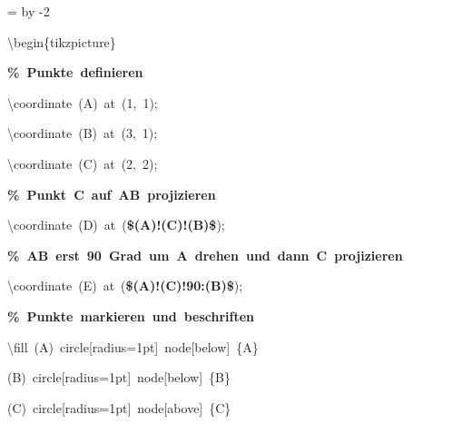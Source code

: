 \begingroup
\ttfamily
{}
=\textwidth
\advance{} by -2\fboxsep
\noindent
\colorbox{background}
{%
\parbox{\dimen255}
{%
\rule[-0.5ex]{0pt}{2.5ex}\hspace*{0.0em}\textbackslash{}begin\{tikzpicture\}\\
\rule[-0.5ex]{0pt}{2.5ex}\hspace*{1.0em}\textcolor{G}{\textbf{\%~Punkte~definieren}}\\
\rule[-0.5ex]{0pt}{2.5ex}\hspace*{1.0em}\textbackslash{}coordinate~(A)~at~(1,~1);\\
\rule[-0.5ex]{0pt}{2.5ex}\hspace*{1.0em}\textbackslash{}coordinate~(B)~at~(3,~1);\\
\rule[-0.5ex]{0pt}{2.5ex}\hspace*{1.0em}\textbackslash{}coordinate~(C)~at~(2,~2);\\
\rule[-0.5ex]{0pt}{2.5ex}\hspace*{1.0em}\textcolor{G}{\textbf{\%~Punkt~C~auf~AB~projizieren}}\\
\rule[-0.5ex]{0pt}{2.5ex}\hspace*{1.0em}\textbackslash{}coordinate~(D)~at~(\textcolor{R}{\textbf{\$(A)!(C)!(B)\$}});\\
\rule[-0.5ex]{0pt}{2.5ex}\hspace*{1.0em}\textcolor{G}{\textbf{\%~AB~erst~90~Grad~um~A~drehen~und~dann~C~projizieren}}\\
\rule[-0.5ex]{0pt}{2.5ex}\hspace*{1.0em}\textbackslash{}coordinate~(E)~at~(\textcolor{R}{\textbf{\$(A)!(C)!90:(B)\$}});\\
\rule[-0.5ex]{0pt}{2.5ex}\hspace*{1.0em}\textcolor{G}{\textbf{\%~Punkte~markieren~und~beschriften}}\\
\rule[-0.5ex]{0pt}{2.5ex}\hspace*{1.0em}\textbackslash{}fill~(A)~circle[radius=1pt]~node[below]~\{A\}\\
\rule[-0.5ex]{0pt}{2.5ex}\hspace*{4.0em}(B)~circle[radius=1pt]~node[below]~\{B\}\\
\rule[-0.5ex]{0pt}{2.5ex}\hspace*{4.0em}(C)~circle[radius=1pt]~node[above]~\{C\}\\
}}
